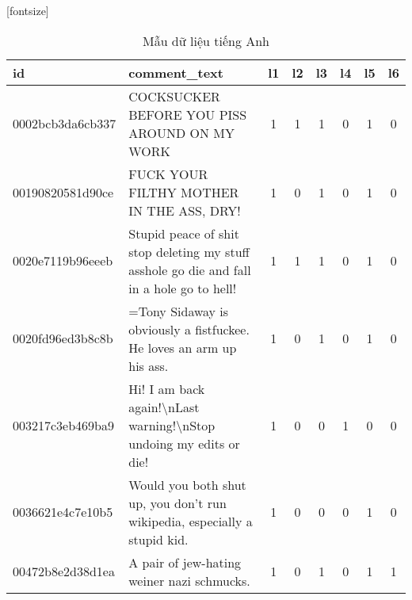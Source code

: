 \begin{center}
    \begin{sidewaystable}[htb]
        \centering
        \caption{Mẫu dữ liệu tiếng Anh}
        [fontsize]
        \fontsize{8pt}{12pt}\selectfont
        \begin{tabularx}{\textwidth}{L{0.8} L{6.6} C{0.1} C{0.1} C{0.1} C{0.1} C{0.1} C{0.1}}
            \toprule
            \textbf{id}      & \textbf{comment\_text}                                                                                                           & \textbf{l1} & \textbf{l2} & \textbf{l3} & \textbf{l4} & \textbf{l5} & \textbf{l6} \\\midrule
            0002bcb3da6cb337 & COCKSUCKER BEFORE YOU PISS AROUND ON MY WORK                                                                                     & 1           & 1           & 1           & 0           & 1           & 0           \\
            00190820581d90ce & FUCK YOUR FILTHY MOTHER IN THE ASS, DRY!                                                                                         & 1           & 0           & 1           & 0           & 1           & 0           \\
            0020e7119b96eeeb & Stupid peace of shit stop deleting my stuff asshole go die and fall in a hole go to hell!                                        & 1           & 1           & 1           & 0           & 1           & 0           \\
            0020fd96ed3b8c8b & =Tony Sidaway is obviously a fistfuckee. He loves an arm up his ass.                                                             & 1           & 0           & 1           & 0           & 1           & 0           \\
            003217c3eb469ba9 & Hi! I am back again!\textbackslash nLast warning!\textbackslash nStop undoing my edits or die!                                   & 1           & 0           & 0           & 1           & 0           & 0           \\
            0036621e4c7e10b5 & Would you both shut up, you don't run wikipedia, especially a stupid kid.                                                        & 1           & 0           & 0           & 0           & 1           & 0           \\
            00472b8e2d38d1ea & A pair of jew-hating weiner nazi schmucks.                                                                                       & 1           & 0           & 1           & 0           & 1           & 1           \\

\end{tabularx}
\end{sidewaystable}
\end{center}
